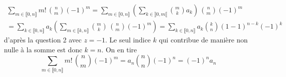 \begin{enumerate}
\begin{multline*}
\sum_{m\in \llbracket 0,n \rrbracket}m!\,\binom{n}{m}(-1)^m
= \sum_{m\in \llbracket 0,n \rrbracket}\left(\sum_{k\in \rrbracket0,m\llbracket}\binom{m}{k}a_k \right) \,\binom{n}{m}(-1)^m\\
= \sum_{k\in \llbracket 0,n \rrbracket}a_k\left(\sum_{m\in \llbracket k,n\rrbracket}\binom{m}{k} \,\binom{n}{m}(-1)^m\right)
= \sum_{k\in \llbracket 0,n \rrbracket}a_k \binom{k}{n}(1-1)^{n-k}(-1)^k
\end{multline*}
d'après la question 2 avec $z=-1$. Le seul indice $k$ qui contribue de manière non nulle à la somme est donc $k=n$. On en tire
\begin{displaymath}
\sum_{m\in \llbracket 0,n \rrbracket}m!\,\binom{n}{m}(-1)^m
=a_n \binom{n}{n} (-1)^n = (-1)^n a_n 
\end{displaymath}

\end{enumerate}

